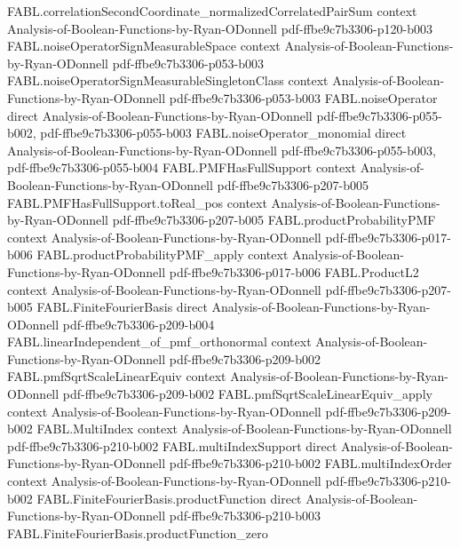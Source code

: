 \begin{theorem}
  {FABL.correlationSecondCoordinate_normalizedCorrelatedPairSum}
  {context}
  {Analysis-of-Boolean-Functions-by-Ryan-ODonnell}
  {pdf-ffbe9c7b3306-p120-b003}
\proofstep
  {FABL.noiseOperatorSignMeasurableSpace}
  {context}
  {Analysis-of-Boolean-Functions-by-Ryan-ODonnell}
  {pdf-ffbe9c7b3306-p053-b003}
\proofstep
  {FABL.noiseOperatorSignMeasurableSingletonClass}
  {context}
  {Analysis-of-Boolean-Functions-by-Ryan-ODonnell}
  {pdf-ffbe9c7b3306-p053-b003}
\proofstep
  {FABL.noiseOperator}
  {direct}
  {Analysis-of-Boolean-Functions-by-Ryan-ODonnell}
  {pdf-ffbe9c7b3306-p055-b002,
    pdf-ffbe9c7b3306-p055-b003}
\proofstep
  {FABL.noiseOperator_monomial}
  {direct}
  {Analysis-of-Boolean-Functions-by-Ryan-ODonnell}
  {pdf-ffbe9c7b3306-p055-b003,
    pdf-ffbe9c7b3306-p055-b004}
\proofstep
  {FABL.PMFHasFullSupport}
  {context}
  {Analysis-of-Boolean-Functions-by-Ryan-ODonnell}
  {pdf-ffbe9c7b3306-p207-b005}
\proofstep
  {FABL.PMFHasFullSupport.toReal_pos}
  {context}
  {Analysis-of-Boolean-Functions-by-Ryan-ODonnell}
  {pdf-ffbe9c7b3306-p207-b005}
\proofstep
  {FABL.productProbabilityPMF}
  {context}
  {Analysis-of-Boolean-Functions-by-Ryan-ODonnell}
  {pdf-ffbe9c7b3306-p017-b006}
\proofstep
  {FABL.productProbabilityPMF_apply}
  {context}
  {Analysis-of-Boolean-Functions-by-Ryan-ODonnell}
  {pdf-ffbe9c7b3306-p017-b006}
\proofstep
  {FABL.ProductL2}
  {context}
  {Analysis-of-Boolean-Functions-by-Ryan-ODonnell}
  {pdf-ffbe9c7b3306-p207-b005}
\proofstep
  {FABL.FiniteFourierBasis}
  {direct}
  {Analysis-of-Boolean-Functions-by-Ryan-ODonnell}
  {pdf-ffbe9c7b3306-p209-b004}
\proofstep
  {FABL.linearIndependent_of_pmf_orthonormal}
  {context}
  {Analysis-of-Boolean-Functions-by-Ryan-ODonnell}
  {pdf-ffbe9c7b3306-p209-b002}
\proofstep
  {FABL.pmfSqrtScaleLinearEquiv}
  {context}
  {Analysis-of-Boolean-Functions-by-Ryan-ODonnell}
  {pdf-ffbe9c7b3306-p209-b002}
\proofstep
  {FABL.pmfSqrtScaleLinearEquiv_apply}
  {context}
  {Analysis-of-Boolean-Functions-by-Ryan-ODonnell}
  {pdf-ffbe9c7b3306-p209-b002}
\proofstep
  {FABL.MultiIndex}
  {context}
  {Analysis-of-Boolean-Functions-by-Ryan-ODonnell}
  {pdf-ffbe9c7b3306-p210-b002}
\proofstep
  {FABL.multiIndexSupport}
  {direct}
  {Analysis-of-Boolean-Functions-by-Ryan-ODonnell}
  {pdf-ffbe9c7b3306-p210-b002}
\proofstep
  {FABL.multiIndexOrder}
  {context}
  {Analysis-of-Boolean-Functions-by-Ryan-ODonnell}
  {pdf-ffbe9c7b3306-p210-b002}
\proofstep
  {FABL.FiniteFourierBasis.productFunction}
  {direct}
  {Analysis-of-Boolean-Functions-by-Ryan-ODonnell}
  {pdf-ffbe9c7b3306-p210-b003}
\proofstep
  {FABL.FiniteFourierBasis.productFunction_zero}

\end{theorem}

